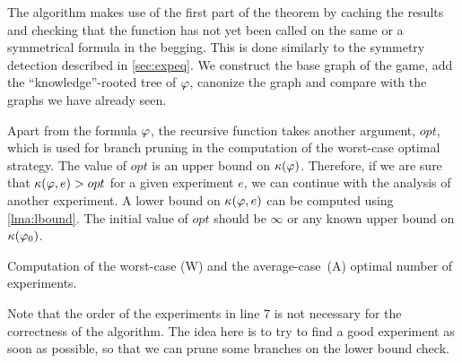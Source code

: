 The algorithm makes use of the first part of the theorem by caching the results and
  checking that the function has not yet been called on the same or a symmetrical formula
  in the begging.
This is done similarly to the symmetry detection described in \autoref{sec:expeq}.
We construct the base graph of the game, add the ``knowledge''-rooted tree of $\varphi$,
  canonize the graph and compare with the graphs we have already seen.

Apart from the formula $\varphi$, the recursive function takes another argument, $opt$,
  which is used for branch pruning in the computation of the worst-case optimal strategy.
The value of $opt$ is an upper bound on $\kappa(\varphi)$.
Therefore, if we are sure that $\kappa(\varphi, e) > opt$ for a given experiment $e$,
  we can continue with the analysis of another experiment.
A lower bound on $\kappa(\varphi, e)$ can be computed using \autoref{lma:lbound}.
The initial value of $opt$ should be $\infty$ or any known upper bound on $\kappa(\varphi_0)$.

\begin{algorithm}[ht]
\caption{Computation of the worst-case (W) and the average-case~(A) optimal number of experiments.}
\label{alg:acopt}
\DontPrintSemicolon
{}
\end{algorithm}

Note that the order of the experiments in line 7
  is not necessary for the correctness of the algorithm.
The idea here is to try to find a good experiment as soon as possible,
  so that we can prune some branches on the lower bound check.
